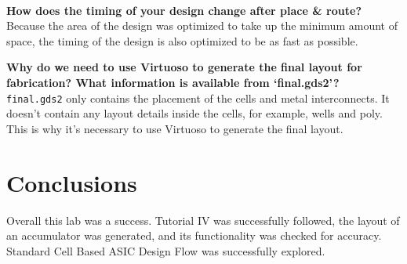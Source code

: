 \documentclass[12pt]{article}
\begin{document}
~\\
\textbf{How does the timing of your design change after place \& route?}\\
Because the area of the design was optimized to take up the minimum amount of space, the timing of the design is also optimized to be as fast as possible.

\newpage
\noindent\textbf{Why do we need to use Virtuoso to generate the final layout for fabrication? What information is available from ‘final.gds2’?}\\
\texttt{final.gds2} only contains the placement of the cells and metal interconnects. It doesn't contain any layout details inside the cells, for example, wells and poly. This is why it's necessary to use Virtuoso to generate the final layout.
\section{Conclusions}
Overall this lab was a success. Tutorial IV was successfully followed, the layout of an accumulator was generated, and its functionality was checked for accuracy. Standard Cell Based ASIC Design Flow was successfully explored.
\end{document}
